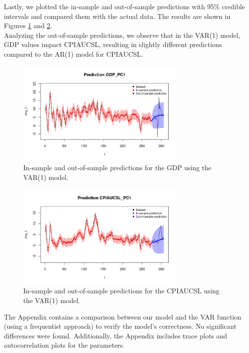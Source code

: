 Lastly, we plotted the in-sample and out-of-sample predictions with 95\% credible intervals and compared them with the actual data. The results are shown in Figures \ref{fig:VAR1_gdp_prediction} and \ref{fig:VAR1_infl_prediction}. \\ 
Analyzing the out-of-sample predictions, we observe that in the VAR(1) model, GDP values impact CPIAUCSL, resulting in slightly different predictions compared to the AR(1) model for CPIAUCSL.
\begin{figure}[H]
    \centering
    \includegraphics[width=0.75\textwidth]{images/6-VAR/gdp_prediction.png}
    \caption{In-sample and out-of-sample predictions for the GDP using the VAR(1) model.}
    \label{fig:VAR1_gdp_prediction} 
\end{figure}
\begin{figure}[H]
    \centering
    \includegraphics[width=0.75\textwidth]{images/6-VAR/infl_prediction.png}
    \caption{In-sample and out-of-sample predictions for the CPIAUCSL using the VAR(1) model.}
    \label{fig:VAR1_infl_prediction}
\end{figure}
The Appendix contains a comparison between our model and the VAR function (using a frequentist approach) to verify the model's correctness. No significant differences were found. Additionally, the Appendix includes trace plots and autocorrelation plots for the parameters.